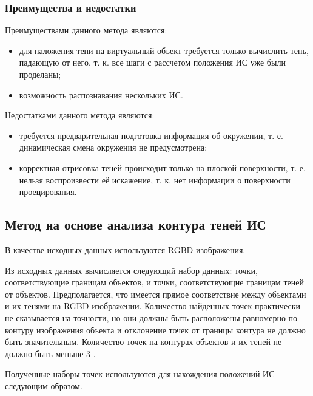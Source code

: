 \subsubsection*{Преимущества и недостатки}

Преимуществами данного метода являются: 
\begin{itemize}
	\item для наложения тени на виртуальный объект требуется только вычислить тень, падающую от него, т. к. все шаги с рассчетом положения ИС уже были проделаны;
	\item возможность распознавания нескольких ИС.
\end{itemize}

Недостатками данного метода являются:
\begin{itemize}
	\item требуется предварительная подготовка информация об окружении, т. е. динамическая смена окружения не предусмотрена;
	\item корректная отрисовка теней происходит только на плоской поверхности, т. е. нельзя воспроизвести её искажение, т. к. нет информации о поверхности проецирования.
\end{itemize}

\subsection{Метод на основе анализа контура теней ИС}

В качестве исходных данных используются RGBD-изображения.

Из исходных данных вычисляется следующий набор данных: точки, соответствующие границам объектов, и точки, соответствующие границам теней от объектов. Предполагается, что имеется прямое соответствие между объектами и их тенями на RGBD-изображении. Количество найденных точек практически не сказывается на точности, но они должны быть расположены равномерно по контуру изображения объекта и отклонение точек от границы контура не должно быть значительным. Количество точек на контурах объектов и их теней не должно быть меньше 3 \cite{shadow_contours_method}.

Полученные наборы точек используются для нахождения положений ИС следующим образом. 


